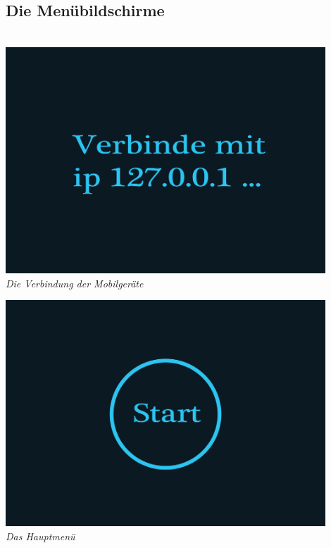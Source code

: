 \begin{flushright}

\subsection{Die Menübildschirme}

\ \\
\includegraphics[width=0.9\textwidth]{img/connect.png}\\
\textit{Die Verbindung der Mobilgeräte}

\newpage

\includegraphics[width=0.9\textwidth]{img/hauptmenu.png}\\
\textit{Das Hauptmenü}\\[2em]


\end{flushright}
